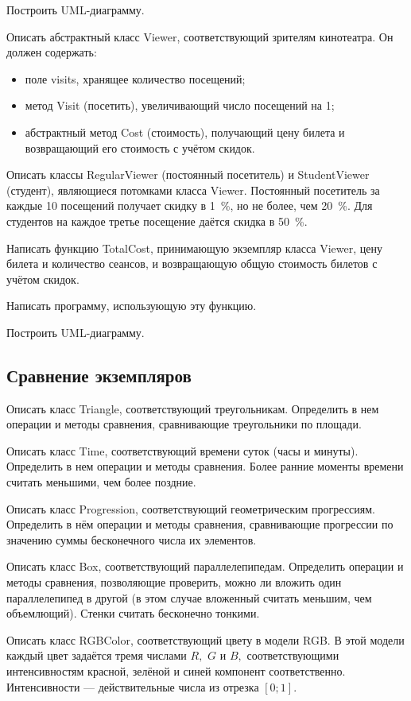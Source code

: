 Построить UML-диаграмму.

\task Описать абстрактный класс Viewer, соответствующий зрителям
кинотеатра. Он должен содержать:
\begin{itemize}
\item поле visits, хранящее количество посещений;
\item метод Visit (посетить), увеличивающий число посещений на 1;
\item абстрактный метод Cost (стоимость), получающий цену билета и
  возвращающий его стоимость с учётом скидок.
\end{itemize}

Описать классы RegularViewer (постоянный посетитель) и StudentViewer
(студент), являющиеся потомками класса Viewer. Постоянный посетитель
за каждые 10 посещений получает скидку в 1~\%, но не более, чем
20~\%. Для студентов на каждое третье посещение даётся скидка в 50~\%.

Написать функцию TotalCost, принимающую экземпляр класса Viewer, цену
билета и количество сеансов, и возвращающую общую стоимость билетов с
учётом скидок.

Написать программу, использующую эту функцию.

Построить UML-диаграмму.


\subsection{Сравнение экземпляров}

\task Описать класс Triangle, соответствующий треугольникам.
Определить в нем операции и методы сравнения, сравнивающие
треугольники по площади.

\task Описать класс Time, соответствующий времени суток (часы и
минуты). Определить в нем операции и методы сравнения. Более ранние
моменты времени считать меньшими, чем более поздние.

\task Описать класс Progression, соответствующий геометрическим
прогрессиям. Определить в нём операции и методы сравнения,
сравнивающие прогрессии по значению суммы бесконечного числа их
элементов.

\task Описать класс Box, соответствующий параллелепипедам. Определить
операции и методы сравнения, позволяющие проверить, можно ли вложить
один параллелепипед в другой (в этом случае вложенный считать меньшим,
чем объемлющий). Стенки считать бесконечно тонкими.

\task Описать класс RGBColor, соответствующий цвету в модели RGB. В
этой модели каждый цвет задаётся тремя числами $R,$ $G$ и $B,$
соответствующими интенсивностям красной, зелёной и синей компонент
соответственно. Интенсивности — действительные числа из отрезка
$[0; 1]$.

